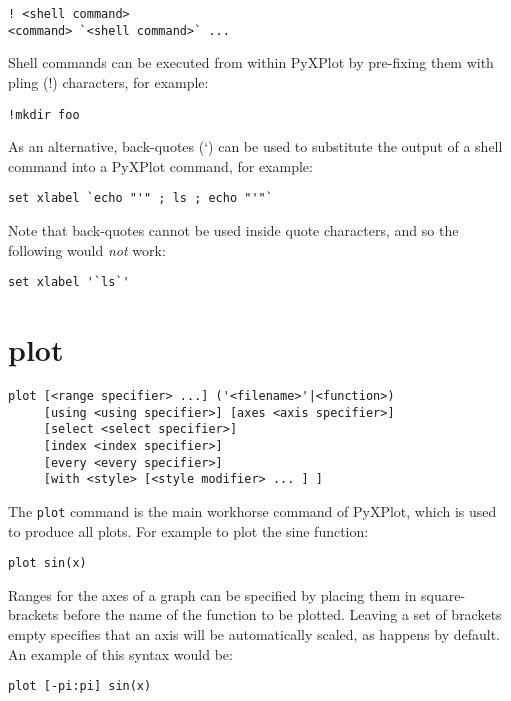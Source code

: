 \documentclass[a4paper,onecolumn,11pt]{book}
\begin{document}
\begin{verbatim}
! <shell command>
<command> `<shell command>` ...
\end{verbatim}

Shell commands can be executed from within PyXPlot by pre-fixing them with
pling (!) characters, for example:

\begin{verbatim}
!mkdir foo
\end{verbatim}

\noindent As an alternative, back-quotes (`) can be used to substitute the
output of a shell command into a PyXPlot command, for example:

\begin{verbatim}
set xlabel `echo "'" ; ls ; echo "'"`
\end{verbatim}

\noindent Note that back-quotes cannot be used inside quote characters, and so
the following would \textit{not} work:

\begin{verbatim}
set xlabel '`ls`'
\end{verbatim}


\section{plot}

\begin{verbatim}
plot [<range specifier> ...] ('<filename>'|<function>)
     [using <using specifier>] [axes <axis specifier>]
     [select <select specifier>]
     [index <index specifier>]
     [every <every specifier>]
     [with <style> [<style modifier> ... ] ]
\end{verbatim}

The {\tt plot} command is the main workhorse command of PyXPlot, which is used
to produce all plots. For example to plot the sine function:

\begin{verbatim}
plot sin(x)
\end{verbatim}

Ranges for the axes of a graph can be specified by placing them in
square-brackets before the name of the function to be plotted. Leaving a set of
brackets empty specifies that an axis will be automatically scaled, as happens
by default. An example of this syntax would be:

\begin{verbatim}
plot [-pi:pi] sin(x)
\end{verbatim}
\end{document}
